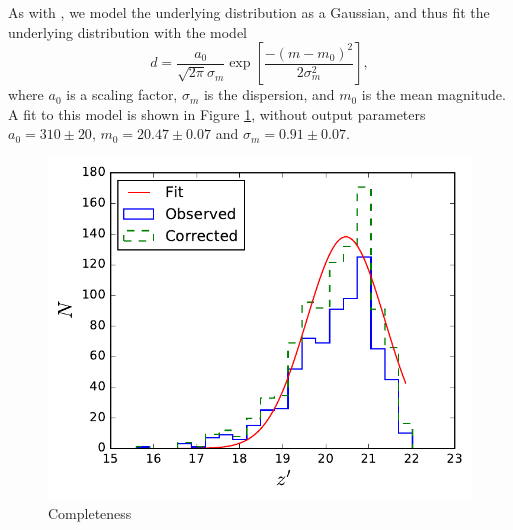 \documentclass[useAMS,usenatbib]{mn2e}
\begin{document}
As with \citet{Salinas2015}, we model the underlying distribution as a  Gaussian, and thus fit the underlying distribution with the model
\begin{equation}
d = \frac{a_0}{\sqrt{2\pi} \sigma_m} \exp\left[\frac{-(m-m_0)^2}{2 \sigma_m^2}\right],
\end{equation}
where $a_0$ is a scaling factor, $\sigma_m$ is the dispersion, and $m_0$ is the mean magnitude. A fit to this model is shown in Figure \ref{fig:underlying}, without output parameters $a_0 = 310\pm20$, $m_0 = 20.47\pm0.07$ and $\sigma_m = 0.91\pm0.07$.
\begin{figure}
	\includegraphics[width=\columnwidth]{images/underlying.pdf}
	\caption{Completeness}
	\label{fig:underlying}
\end{figure}
\end{document}
